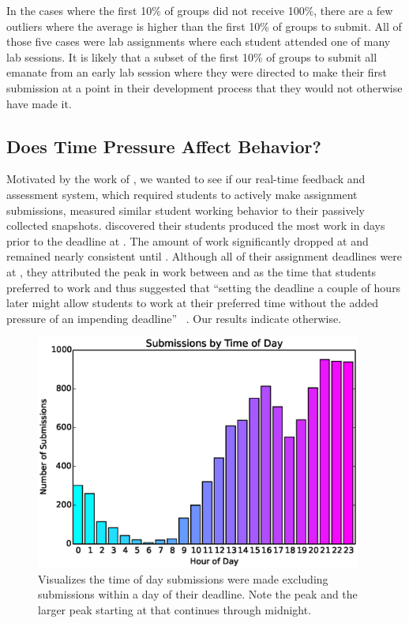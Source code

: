 In the cases where the first 10\% of groups did not receive 100\%, there are a
few outliers where the average is higher than the first 10\% of groups to
submit. All of those five cases were lab assignments where each student
attended one of many lab sessions. It is likely that a subset of the first 10\%
of groups to submit all emanate from an early lab session where they were
directed to make their first submission at a point in their development process
that they would not otherwise have made it.

\subsection{Does Time Pressure Affect Behavior?}

Motivated by the work of \spacco{}, we wanted to see if our real-time feedback
and assessment system, which required students to actively make assignment
submissions, measured similar student working behavior to their passively
collected snapshots. \spacco{} discovered their students produced the most work
in days prior to the deadline at . The amount of work significantly
dropped at  and remained nearly consistent until . Although all of
their assignment deadlines were at , they attributed the peak in work
between  and  as the time that students preferred to work and thus
suggested that ``setting the deadline a couple of hours later might allow
students to work at their preferred time without the added pressure of an
impending deadline'' ~\cite{Spacco:2013:TIP:2462476.2465594}. Our results
indicate otherwise.

\begin{figure}[!t]
\centering
\includegraphics[trim=0 .12in 0 .10in, clip, width=4.215in]{graphs/Submissions_by_Time_of_Day.eps}
\caption{Visualizes the time of day submissions were made excluding submissions
  within a day of their deadline. Note the  peak and the larger peak
  starting at  that continues through midnight.}
\end{figure}


